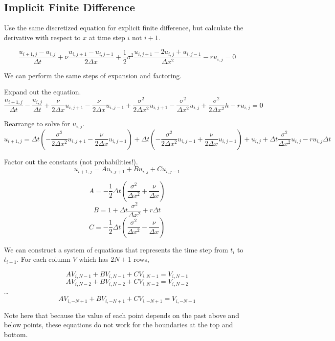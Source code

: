 \documentclass[11pt]{article}
\begin{document}
    \subsection{Implicit Finite
Difference}\label{implicit-finite-difference}

    Use the same discretized equation for explicit finite difference, but
calculate the derivative with respect to \(x\) at time step \(i\) not
\(i + 1\).

\[\frac{u_{i+1, j} - u_{i, j}}{\Delta t} + \nu \frac{u_{i,j+1} - u_{i,j-1}}{2\Delta x} + \frac{1}{2} \sigma^2 \frac{u_{i,j+1} - 2u_{i,j} + u_{i,j-1}}{\Delta x^2} - r u_{i, j} = 0\]

    We can perform the same steps of expansion and factoring.

    Expand out the equation.
\[\frac{u_{i+1, j}}{\Delta t} - \frac{u_{i, j}}{\Delta t} + \frac{\nu}{2\Delta x} u_{i, j+1} - \frac{\nu}{2\Delta x} u_{i, j-1} + \frac{\sigma^2}{2\Delta x^2} u_{i, j+1} - \frac{\sigma^2}{\Delta x^2} u_{i, j} + \frac{\sigma^2}{2 \Delta x^2} h - ru_{i, j} = 0\]

Rearrange to solve for \(u_{i, j}\).
\[u_{i + 1, j} = \Delta t \left( -\frac{\sigma^2}{2\Delta x^2} u_{i, j+1} - \frac{\nu}{2\Delta x} u_{i, j+1} \right) + \Delta t \left( -\frac{\sigma^2}{2\Delta x^2} u_{i, j-1} + \frac{\nu}{2\Delta x} u_{i, j-1} \right) + u_{i, j} + \Delta t \frac{\sigma^2}{\Delta x^2} u_{i, j} - ru_{i, j} \Delta t\]

Factor out the constants (not probabilities!).
\[u_{i + 1, j} = A u_{i, j+1} + B u_{i, j} + C u_{i, j-1}\]

\[A = -\frac{1}{2} \Delta t \left( \frac{\sigma^2}{\Delta x^2} + \frac{\nu}{\Delta x} \right)\]
\[B = 1 + \Delta t \frac{\sigma^2}{\Delta x^2} + r \Delta t\]
\[C = -\frac{1}{2} \Delta t \left( \frac{\sigma^2}{\Delta x^2} - \frac{\nu}{\Delta x} \right)\]

    We can construct a system of equations that represents the time step
from \(t_i\) to \(t_{i + 1}\). For each column \(V\) which has
\(2N + 1\) rows,

\[A V_{i, N - 1} + B V_{i, N - 1} + C V_{i, N - 1} = V_{i, N - 1}\]
\[A V_{i, N - 2} + B V_{i, N - 2} + C V_{i, N - 2} = V_{i, N - 2}\]
\ldots{}
\[A V_{i, -N + 1} + B V_{i, -N + 1} + C V_{i, -N + 1} = V_{i, -N + 1}\]

Note here that because the value of each point depends on the past above
and below points, these equations do not work for the boundaries at the
top and bottom.
\end{document}
